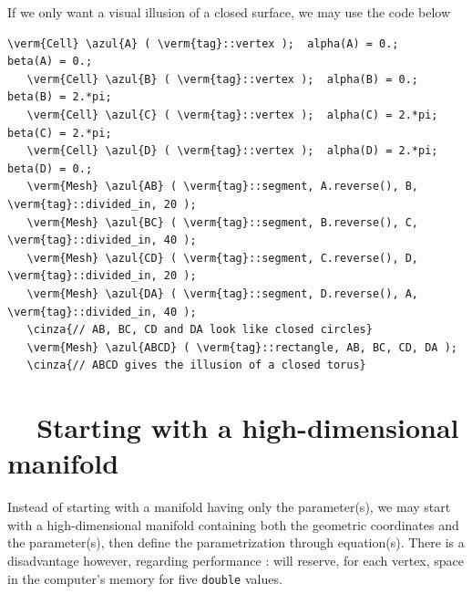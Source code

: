 If we only want a visual illusion of a closed surface, we may use the code below

\begin{Verbatim}[commandchars=\\\{\},formatcom=\small\tt,baselinestretch=0.94]
   \verm{Cell} \azul{A} ( \verm{tag}::vertex );  alpha(A) = 0.;     beta(A) = 0.;
   \verm{Cell} \azul{B} ( \verm{tag}::vertex );  alpha(B) = 0.;     beta(B) = 2.*pi;
   \verm{Cell} \azul{C} ( \verm{tag}::vertex );  alpha(C) = 2.*pi;  beta(C) = 2.*pi;
   \verm{Cell} \azul{D} ( \verm{tag}::vertex );  alpha(D) = 2.*pi;  beta(D) = 0.;
   \verm{Mesh} \azul{AB} ( \verm{tag}::segment, A.reverse(), B, \verm{tag}::divided_in, 20 );
   \verm{Mesh} \azul{BC} ( \verm{tag}::segment, B.reverse(), C, \verm{tag}::divided_in, 40 );
   \verm{Mesh} \azul{CD} ( \verm{tag}::segment, C.reverse(), D, \verm{tag}::divided_in, 20 );
   \verm{Mesh} \azul{DA} ( \verm{tag}::segment, D.reverse(), A, \verm{tag}::divided_in, 40 );
   \cinza{// AB, BC, CD and DA look like closed circles}
   \verm{Mesh} \azul{ABCD} ( \verm{tag}::rectangle, AB, BC, CD, DA );
   \cinza{// ABCD gives the illusion of a closed torus}
\end{Verbatim}


\section{~~Starting with a high-dimensional manifold}\label{\numb section 2.\numb parag 17}

Instead of starting with a manifold having only the parameter(s), we may start with a
high-dimensional manifold containing both the geometric coordinates and the parameter(s),
then define the parametrization through equation(s).
There is a disadvantage however, regarding performance : {\maniFEM} will reserve,
for each vertex, space in the computer's memory for five {\small\tt double} values.

